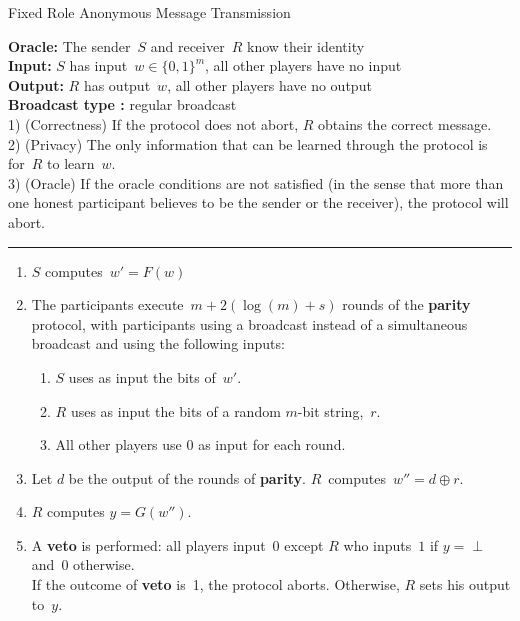 \documentclass[11pt]{article}
\begin{document}
\begin{protocol}\caption{Fixed Role Anonymous Message Transmission}
\label{prot:fr-anon-mes-trans}
{\bf Oracle:} The sender~$S$ and receiver~$R$ know their identity \\
{\bf Input:} $S$ has input~$w \in \{0,1\}^m$, all other players have no input  \\
{\bf Output:} $R$ has output~$w$, all other players have no output    \\
{\bf Broadcast type :}  regular broadcast\\
1) (Correctness) If the protocol does not abort, $R$ obtains the
correct message. \\
2) (Privacy) The only information that can be learned through the
protocol
is for~$R$ to learn~$w$. \\
3) (Oracle) If the oracle conditions are not satisfied (in the sense
that more than one honest participant  believes to be the sender or
the receiver), the protocol will abort.

\vspace{4pt} \hrule \vspace{4pt}

\begin{enumerate}
\item $S$ computes~$w'=F(w)$
\item The participants execute~$m+2(\log (m)+s)$ rounds of the  \textbf{parity}
protocol, with participants using a
broadcast instead of a simultaneous broadcast and using the
following inputs:
\begin{enumerate}
\item $S$ uses as input the bits of~$w'$.
\item $R$ uses as input the bits of a random $m$-bit string,~$r$.
\item All other players use $0$ as input for each round.
\end{enumerate}
\item Let $d$ be the output of the rounds of \textbf{parity}.  $R$~computes~$w''=d \oplus r$.
\item $R$ computes $y=G(w'')$.
\item \label{step:veto} A \textbf{veto} is performed:  all players input~0 except $R$ who inputs~$1$ if  $y=\perp$ and~$0$ otherwise.  \\
If the outcome of \textbf{veto} is~1, the protocol aborts.
Otherwise, $R$ sets his output to~$y$.
\end{enumerate}
\end{protocol}
\end{document}
